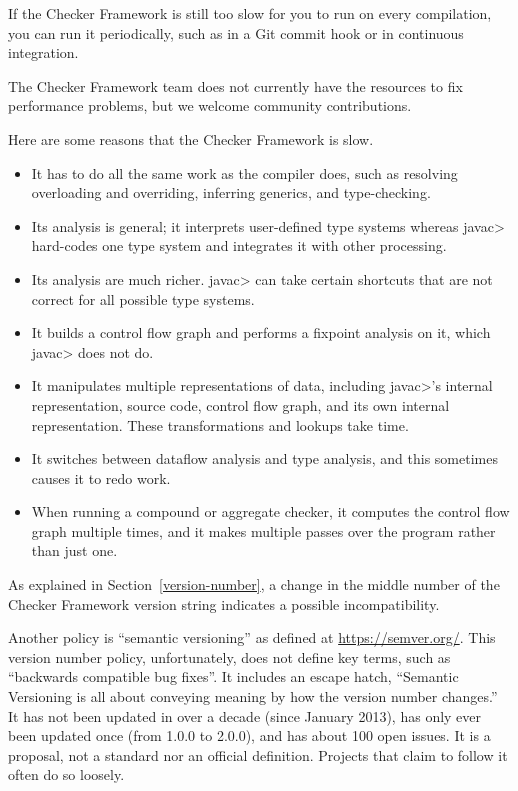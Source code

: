 If the Checker Framework is still too slow for you to run on every compilation,
you can run it periodically, such as in a Git commit hook or in continuous
integration.

The Checker Framework team does not currently have the resources to fix
performance problems, but we welcome community contributions.

Here are some reasons that the Checker Framework is slow.
\begin{itemize}
\item
  It has to do all the same work as the compiler does, such as resolving
  overloading and overriding, inferring generics, and type-checking.
\item
  Its analysis is general; it interprets user-defined type systems whereas
  \<javac> hard-codes one type system and integrates it with other processing.
\item
  Its analysis are much richer.  \<javac> can take certain shortcuts that
  are not correct for all possible type systems.
\item
  It builds a control flow graph and performs a fixpoint analysis on it,
  which \<javac> does not do.
\item
  It manipulates multiple representations of data, including \<javac>'s
  internal representation, source code, control flow graph, and its own
  internal representation.  These transformations and lookups take time.
\item
  It switches between dataflow analysis and type analysis, and this
  sometimes causes it to redo work.
\item
  When running a compound or aggregate checker, it computes the control
  flow graph multiple times, and it makes multiple passes over the program
  rather than just one.
\end{itemize}



As explained in Section~\ref{version-number}, a change in the middle number
of the Checker Framework version string indicates a possible
incompatibility.

Another policy is ``semantic versioning'' as defined at
\url{https://semver.org/}.  This version number policy, unfortunately,
does not define key terms, such as ``backwards compatible bug fixes''.  It
includes an
escape hatch, ``Semantic Versioning is all about conveying meaning by how
the version number changes.''  It has not been updated in over a decade
(since January 2013), has only ever been updated once (from
1.0.0 to 2.0.0), and has
about 100 open issues.
It is a proposal, not a standard nor an official definition.
Projects that claim to follow it often do so loosely.

